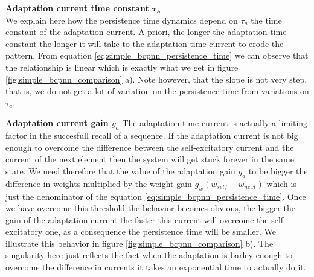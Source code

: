 \documentclass[10pt,a4paper]{article}
\begin{document}
\textbf{Adaptation current time constant} $\mathbf{\tau_{a}}$ \\
We explain here how the persistence time dynamics depend on $\tau_a$ the time constant of the adaptation current. A priori, the longer the adaptation time constant the longer it will take to the adaptation time current to erode the pattern. From equation \ref{eq:simple_bcpnn_persistence_time} we can observe that the relationship is linear which is exactly what we get in figure \ref{fig:simple_bcpnn_comparison} a).  Note however, that the slope is not very step, that is, we do not get a lot of variation on the persistence time from variations on $\tau_a$. 

\textbf{Adaptation current gain $g_a$}
The adaptation time current is actually a limiting factor in the succesfull recall of a sequence. If the adaptation current is not big enough to overcome the difference between the self-excitatory current and the current of the next element then the system will get stuck forever in the same state.  We need therefore that the value of the adaptation gain $g_a$ to be bigger the difference in weights multiplied by the weight gain $ g_w (w_{self}  - w_{next})$ which is just the denominator of the equation \ref{eq:simple_bcpnn_persistence_time}. Once we have overcome this threshold the behavior becomes obvious, the bigger the gain of the adaptation current the faster this current will overcome the self-excitatory one, as a consequence the persistence time will be smaller. We illustrate this behavior in figure \ref{fig:simple_bcpnn_comparison} b). The singularity here just reflects the fact when the adaptation is barley enough to overcome the difference in currents it takes an exponential time to actually do it. 
\end{document}
